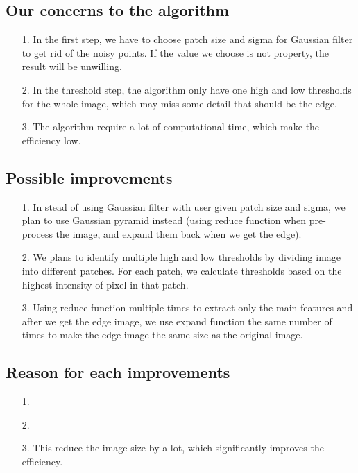 \documentclass[10pt,twocolumn,letterpaper]{article}
\begin{document}
\subsection{Our concerns to the algorithm}
\begin{enumerate}
	\item[1.] In the first step, we have to choose patch size and sigma for Gaussian filter to get rid of the noisy points. If the value we choose is not property, the result will be unwilling.
	\item[2.] In the threshold step, the algorithm only have one high and low thresholds for the whole image, which may miss some detail that should be the edge.
	\item[3.] The algorithm require a lot of computational time, which make the efficiency low.
\end{enumerate}

\subsection{Possible improvements}
\begin{enumerate}
	\item[1.] In stead of using Gaussian filter with user given patch size and sigma, we plan to use Gaussian pyramid instead (using reduce function when pre-process the image, and expand them back when we get the edge).
	\item[2.] We plans to identify multiple high and low thresholds by dividing image into different patches. For each patch, we calculate thresholds based on the highest intensity of pixel in that patch.
	\item[3.] Using reduce function multiple times to extract only the main features and after we get the edge image, we use expand function the same number of times to make the edge image the same size as the original image.
\end{enumerate}

\subsection{Reason for each improvements}
\begin{enumerate}
	\item[1.] 
	\item[2.]  
	\item[3.] This reduce  the image size by a lot, which significantly improves the efficiency.
\end{enumerate}
\end{document}
